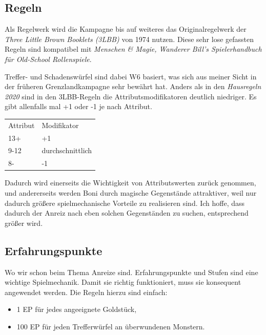 \documentclass[11pt]{wbzine}
\begin{document}
\begin{multicols}{2}
\section{Regeln}

    Als Regelwerk wird die Kampagne bis auf weiteres das
    Originalregelwerk der \textit{Three Little Brown Booklets
    (3LBB)} von 1974 nutzen.  Diese sehr lose gefassten Regeln sind
    kompatibel mit \textit{Menschen \& Magie, Wanderer Bill's
    Spielerhandbuch für Old-School Rollenspiele}. 

    Treffer- und Schadenswürfel sind dabei W6 basiert, was sich aus
    meiner Sicht in der früheren Grenzlandkampagne sehr bewährt hat.
    Anders als in den \textit{Hausregeln 2020} sind in den
    3LBB-Regeln die Attributsmodifikatoren deutlich niedriger. Es
    gibt allenfalls mal +1 oder -1 je nach Attribut. 

    \begin{tabularx}{\columnwidth}{YY}
	Attribut & Modifikator \\
	13+ & +1 \\
	9-12 & durchschnittlich \\
	8- & -1 \\
    \end{tabularx}

    Dadurch wird einerseits die Wichtigkeit von Attributswerten
    zurück genommen, und andererseits werden Boni durch magische
    Gegenstände attraktiver, weil nur dadurch größere
    spielmechanische Vorteile zu realisieren sind. Ich hoffe, dass
    dadurch der Anreiz nach eben solchen Gegenständen zu suchen,
    entsprechend größer wird.

    \subsection{Erfahrungspunkte}
    \label{xp}

    Wo wir schon beim Thema Anreize sind. Erfahrungspunkte und
    Stufen sind eine wichtige Spielmechanik. Damit sie richtig
    funktioniert, muss sie konsequent angewendet werden. Die Regeln
    hierzu sind einfach: 

    \begin{tcolorbox}
	\begin{itemize}
	    \item 1 EP für jedes angeeignete Goldstück, 

	\item 100 EP für jeden Trefferwürfel an überwundenen
	    Monstern.
	\end{itemize}
    \end{tcolorbox}


\end{multicols}
\end{document}
